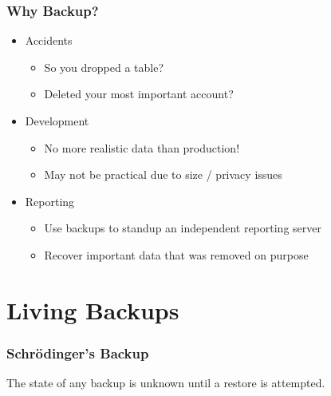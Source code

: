 \documentclass[hyperref={pdfpagelabels=false}]{beamer}
\begin{document}
    \begin{frame}
        \frametitle{Why Backup?}

        \begin{itemize}
            \item Accidents

            \begin{itemize}
                \item So you dropped a table?
                \item Deleted your most important account?
            \end{itemize}

            \item Development

            \begin{itemize}
                \item No more realistic data than production!
                \item May not be practical due to size / privacy issues
            \end{itemize}

            \item Reporting

            \begin{itemize}
                \item Use backups to standup an independent reporting server
                \item Recover important data that was removed on purpose
            \end{itemize}
        \end{itemize}
    \end{frame}

    \section{Living Backups}

    \begin{frame}
        \frametitle{Schr\"{o}dinger’s Backup}

        The state of any backup is unknown until a restore is attempted.
    \end{frame}
\end{document}
